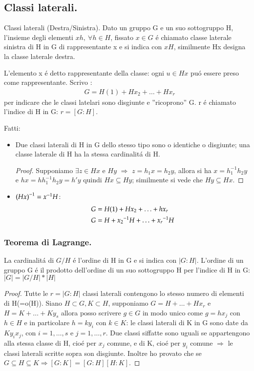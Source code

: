 \documentclass[oneside,12pt]{memoir}
\begin{document}
\subsection{Classi laterali.}

\begin{definition}{Classi laterali (Destra/Sinistra).}
Dato un gruppo G e un suo sottogruppo H, l'insieme degli elementi $xh,\ \forall h \in H$, fissato $x \in G$ \'e chiamato classe laterale sinistra di H in G di rappresentante x e si indica con $xH$, similmente Hx designa la classe laterale destra.

L'elemento x \'e detto rappresentante della classe: ogni $u\in Hx$ pu\'o essere preso come rappresentante. Scrivo :
\begin{align*}
&G=H(1)+Hx_2+\ldots+Hx_r
\end{align*}
per indicare che le classi latelari sono disgiunte e ''ricoprono'' G. r \'e chiamato l'indice di H in G: $r=[G:H]$.
\end{definition}

Fatti:
\begin{itemize}
\item Due classi laterali di H in G dello stesso tipo sono o identiche o disgiunte; una classe laterale di H ha la stessa cardinalit\'a di H.
\begin{proof}
Supponiamo $\exists z \in Hx$ e $Hy$ $\Rightarrow$ $z=h_1x=h_2y$, allora si ha $x=h_1^{-1}h_2y$ e $hx=hh_1^{-1}h_2y=h'y$ quindi $Hx \subseteq Hy$; similmente si vede che $Hy\subseteq Hx$.
\end{proof}

\item ${{(Hx)}^{-1}}={{x}^{-1}}H$:
\begin{align*}
&G=H(1)+Hx_2+\ldots+hx_r\\
&G=H+{{x_2}^{-1}}H+\ldots+{{x_r}^{-1}}H
\end{align*}

\end{itemize}

\subsubsection{Teorema di Lagrange.}
La cardinalit\'a di $G/H$ \'e l'ordine di H in G e si indica con $|G:H|$.
L'ordine di un gruppo G \'e il prodotto dell'ordine di un suo sottogruppo H per l'indice di H in G: $|G|=|G/H|*|H|$
\begin{proof}
Tutte le $r=|G:H|$ classi laterali contengono lo stesso numero di elementi di H(=o(H)). Siano $H\subset G,K\subset H$, supponiamo $G=H + \ldots + Hx_r$ e $H=K+ \ldots + Ky_s$ allora posso scrivere $g\in G$ in modo unico come $g=hx_j$ con $h\in H$ e in particolare $h=ky_i$ con $k\in K$: le classi laterali di K in G sono date da $Ky_ix_j$, con $i=1,\ldots ,s$ e $j=1,\ldots ,r$. Due classi siffatte sono uguali se appartengono alla stessa classe di H, cio\'e per $x_j$ comune, e di K, cio\'e per $y_i$ comune $\Rightarrow$ le classi laterali scritte sopra son disgiunte.
Inoltre ho provato che se $G\subseteq H\subseteq K\Rightarrow [G:K]=[G:H][H:K]$. 

\end{proof}
\end{document}
